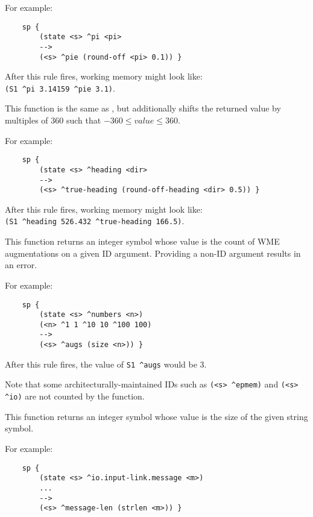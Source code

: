 \begin{description}
	For example:
	
	\begin{verbatim}
	sp {
	    (state <s> ^pi <pi>
	    -->
	    (<s> ^pie (round-off <pi> 0.1)) }
	\end{verbatim}
	
	After this rule fires, working memory might look like: \\
	\verb|(S1 ^pi 3.14159 ^pie 3.1)|.


\item [\soarb{round-off-heading} --- ] 
	This function is the same as , but additionally shifts the returned value by multiples of 360 such that $-360 \le value \le 360$.

	For example:
	
	\begin{verbatim}
	sp {
	    (state <s> ^heading <dir>
	    -->
	    (<s> ^true-heading (round-off-heading <dir> 0.5)) }
	\end{verbatim}
	
	After this rule fires, working memory might look like: \\
	\verb|(S1 ^heading 526.432 ^true-heading 166.5)|.


\item [\soarb{size} --- ] 
	This function returns an integer symbol whose value is the count of WME augmentations on a given ID argument. Providing a non-ID argument results in an error.

	For example:
	
	\begin{verbatim}
	sp {
	    (state <s> ^numbers <n>)
	    (<n> ^1 1 ^10 10 ^100 100)
	    -->
	    (<s> ^augs (size <n>)) }
	\end{verbatim}
	
	After this rule fires, the value of \verb=S1 ^augs= would be $3$.
	
	Note that some architecturally-maintained IDs such as \verb=(<s> ^epmem)= and \verb=(<s> ^io)= are not counted by the  function.

\item [\soarb{strlen} --- ] 
	This function returns an integer symbol whose value is the size of the given string symbol.

	For example:
	
	\begin{verbatim}
	sp {
	    (state <s> ^io.input-link.message <m>)
	    ...
	    -->
	    (<s> ^message-len (strlen <m>)) }
	\end{verbatim}



\end{description}
